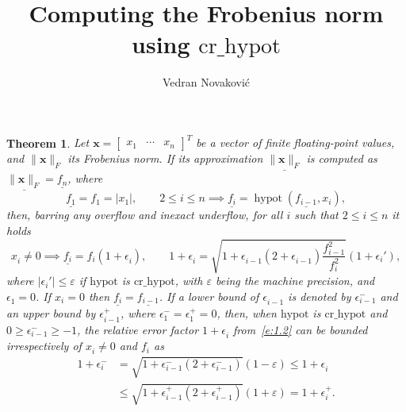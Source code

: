 \documentclass[a4paper,12pt,twoside]{article}
\title{Computing the Frobenius norm using $\mathrm{cr\_hypot}$}
\author{Vedran Novakovi\'{c}}
\newtheorem{thm}{Theorem}
\begin{document}
\maketitle
\begin{thm}\label{t:1.1}
  Let $\mathbf{x}=\begin{bmatrix}x_1&\cdots&x_n\end{bmatrix}^T$ be a
  vector of finite floating-point values, and $\|\mathbf{x}\|_F$ its
  Frobenius norm.  If its approximation $\underline{\|\mathbf{x}\|_F}$
  is computed as $\underline{\|\mathbf{x}\|_F}=\underline{f_n}$, where
  \begin{equation}
    \underline{f_1}=f_1=|x_1|,\qquad
    2\le i\le n\implies\underline{f_i}=\mathop{\mathrm{hypot}}(\underline{f_{i-1}},x_i),
    \label{e:1.1}
  \end{equation}
  then, barring any overflow and inexact underflow, for all $i$ such
  that $2\le i\le n$ it holds
  \begin{equation}
    x_i^{}\ne 0\implies\underline{f_i^{}}=f_i^{}(1+\epsilon_i^{}),\qquad
    1+\epsilon_i^{}=\sqrt{1+\epsilon_{i-1}^{}(2+\epsilon_{i-1}^{})\frac{f_{i-1}^2}{f_i^2}}(1+\epsilon_i'),
    \label{e:1.2}
  \end{equation}
  where $|\epsilon_i'|\le\varepsilon$ if $\mathrm{hypot}$ is
  $\mathrm{cr\_hypot}$, with $\varepsilon$ being the machine
  precision, and $\epsilon_1^{}=0$.  If $x_i=0$ then
  $\underline{f_i}=\underline{f_{i-1}}$.  If a lower bound of
  $\epsilon_{i-1}^{}$ is denoted by $\epsilon_{i-1}^-$ and an upper
  bound by $\epsilon_{i-1}^+$, where $\epsilon_1^-=\epsilon_1^+=0$,
  then, when $\mathrm{hypot}$ is $\mathrm{cr\_hypot}$ and
  $0\ge\epsilon_{i-1}^-\ge-1$, the relative error factor
  $1+\epsilon_i^{}$ from~\eqref{e:1.2} can be bounded irrespectively
  of $x_i^{}\ne 0$ and $f_i^{}$ as
  \begin{equation}
    \begin{aligned}
      1+\epsilon_i^-&=\sqrt{1+\epsilon_{i-1}^-(2+\epsilon_{i-1}^-)}(1-\varepsilon)\le 1+\epsilon_i^{}\\
      &\le\sqrt{1+\epsilon_{i-1}^+(2+\epsilon_{i-1}^+)}(1+\varepsilon)=1+\epsilon_i^+.
    \end{aligned}
    \label{e:1.3}
  \end{equation}
\end{thm}
\end{document}
